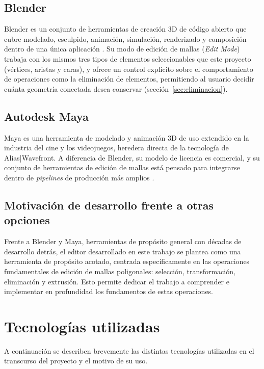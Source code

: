 \subsection{Blender}

Blender es un conjunto de herramientas de creación 3D de código abierto que cubre modelado, esculpido, animación, simulación, renderizado y composición dentro de una única aplicación \cite{blender}. Su modo de edición de mallas (\emph{Edit Mode}) trabaja con los mismos tres tipos de elementos seleccionables que este proyecto (vértices, aristas y caras), y ofrece un control explícito sobre el comportamiento de operaciones como la eliminación de elementos, permitiendo al usuario decidir cuánta geometría conectada desea conservar (sección~\ref{sec:eliminacion}).

\subsection{Autodesk Maya}

Maya es una herramienta de modelado y animación 3D de uso extendido en la industria del cine y los videojuegos, heredera directa de la tecnología de Alias|Wavefront. A diferencia de Blender, su modelo de licencia es comercial, y su conjunto de herramientas de edición de mallas está pensado para integrarse dentro de \emph{pipelines} de producción más amplios \cite{maya}.

\subsection{Motivación de desarrollo frente a otras opciones}

Frente a Blender y Maya, herramientas de propósito general con décadas de desarrollo detrás, el editor desarrollado en este trabajo se plantea como una herramienta de propósito acotado, centrada específicamente en las operaciones fundamentales de edición de mallas poligonales: selección, transformación, eliminación y extrusión. Esto permite dedicar el trabajo a comprender e implementar en profundidad los fundamentos de estas operaciones.

\section{Tecnologías utilizadas}

A continuación se describen brevemente las distintas tecnologías utilizadas en el transcurso del proyecto y el motivo de su uso.

